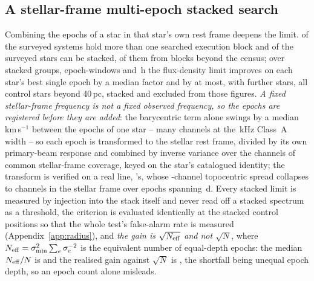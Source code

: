 \subsection{A stellar-frame multi-epoch stacked search}
\label{sec:stack}

Combining the epochs of a star in that star's own rest frame deepens the
limit. \EpMulti{} of the \NSystems{} surveyed systems hold more than one
searched execution block and \SxStkStarCensus{} of the surveyed stars can be
stacked, \SttNStkOneEb{} of them from blocks beyond the census; over
\SyStkNGroup{} stacked groups, \SyStkNEpochComb{} epoch-windows and
\SyStkHours\,h the flux-density limit improves on each star's best single epoch
by a median factor \SyStkGainMed{} and by \SyStkGainMax{} at most, with
\SxStkStarOutside{} further stars, all control stars beyond 40\,pc, stacked and
excluded from those figures. \emph{A fixed stellar-frame frequency is not a
fixed observed frequency, so the epochs are registered before they are added}:
the barycentric term alone swings by a median \StkVcorrSwingMed\,km\,s$^{-1}$
between the epochs of one star -- many channels at the \StkRefChanKHz\,kHz
Class~A width -- so each epoch is transformed to the stellar rest frame,
divided by its own primary-beam response and combined by inverse variance over
the channels of common stellar-frame coverage, keyed on the star's catalogued
identity; the transform is verified on a real line, \StkPersistLineStar's,
whose \StkRegTopoChan-channel topocentric spread collapses to
\StkRegStellarChan{} channels in the stellar frame over \StkRegNEpoch{}
epochs spanning \StkRegSpanD\,d. Every stacked limit is
measured by injection into the stack itself and never read off a stacked
spectrum as a threshold, the criterion is evaluated identically at the stacked
control positions so that the whole test's false-alarm rate is measured
(Appendix~\ref{app:radius}), and \emph{the gain is $\sqrt{N_{\rm eff}}$ and not
$\sqrt{N}$}, where $N_{\rm eff}=\sigma_{\min}^{2}\sum_e\sigma_e^{-2}$ is the
equivalent number of equal-depth epochs: the median $N_{\rm eff}/N$ is
\StkNeffFrac{} and the realised gain against $\sqrt{N}$ is \StkGainVsN, the
shortfall being unequal epoch depth, so an epoch count alone misleads.

